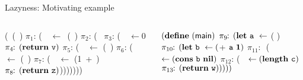 \documentclass[xcolor=x11names,compress,mathserif]{beamer}
\renewcommand{\(}{\begin{columns}}
\renewcommand{\)}{\end{columns}}
\newcommand{\<}[1]{\begin{column}{#1}}
\renewcommand{\>}{\end{column}}
\begin{document}
\begin{frame} {Lazyness: Motivating example}
\small
\begin{columns}
\begin{column}[T]{.45\textwidth}
  \renewcommand{\arraystretch}{1.1}{
    \begin{uprogram}
      \UFL (\DEFINE\ (\length~\xl)
        $\pi_1\!\!:\, ${(\LET\ \px\ $\leftarrow $\ (\NULLQ~\xl) }\IN
       \hspace*{.05cm} $\pi_2\!\!:\,$(\SIF\  \px
       \hspace*{.27cm} $\pi_3\!\!:\, $(\LET\ \pv\ $\leftarrow 0$ \IN
       \hspace*{.32cm} $\pi_4\!\!:\,
      (\mbox{$\mathbf{ return}$}~\mbox{\tt v})$
       \hspace*{.29cm}    $\pi_5\!\!:\, ${(\LET~\pu\
        $\leftarrow$  (\CDR~\xl)  }\IN
       \hspace*{.34cm}   $\pi_6\!\!:\, ${(\LET~\py\
        $\leftarrow$  (\length~\pu)  }\IN
      \UNL{5} \hspace*{.34cm} $\pi_7\!\!:\,
      ${(\LET~\pz\ $\leftarrow$ (1~+~\py) }\IN
      \UNL{6} \hspace*{.34cm} $\pi_8\!\!:\,
      {(\mbox{$\mathbf{ return}$}~\mbox{\tt z})}$)))))))
  \end{uprogram}}
\end{column}
\begin{column}[T]{0.45\textwidth}
\renewcommand{\arraystretch}{1.1}{
    \begin{uprogram}
       $(\mbox{$\mathbf{define}$}\ ({\sf main})$
       \!\!$\pi_9\!\!:\, (\mbox{$\mathbf{ let}$}\  \mbox{\tt a}\  \leftarrow$
      (
      ) \IN  
       \!\!$\pi_{10}\!\!:\, (\mbox{$\mathbf{ let}$}\  \mbox{\tt b}\  \leftarrow ($+$\ \mbox{\tt a}\ \mathbf{1})$
      \IN
      \UNL{4}   \hspace*{.05cm}$\pi_{11}\!\!:\,      $ (\LET\ \pc\
      $\leftarrow  (\mbox{$\mathbf{cons}$}\ \mbox{\tt b}\ \mbox{$\mathbf{ nil}$})$ \IN
         \hspace*{.15cm}    $\pi_{12}\!\!:\,
      $(\LET\ \pw\  $\leftarrow  (\mathbf{length}\ \mbox{\tt c})$ \IN
      \UNL{6}  \hspace*{.25cm}  $\pi_{13}\!\!:\,
      (\mbox{$\mathbf{ return}$}~\mbox{\tt w})))))$
  \end{uprogram}}
\end{column}
\end{columns}
\end{frame}
\end{document}
